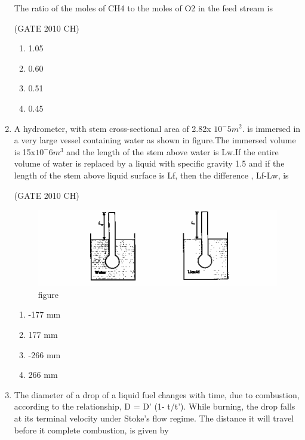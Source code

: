 \documentclass[journal,12pt,onecolumn]{exam}
\theoremstyle{remark}
\begin{document}
\begin{enumerate}
      
    The ratio of the moles of CH4 to the moles of O2 in the feed stream is 
  
  \hfill{(GATE 2010 CH)}\\

  \begin{enumerate}
      \item 1.05
      \item 0.60
      \item 0.51
      \item 0.45
  \end{enumerate}
\item 
   A hydrometer, with stem cross-sectional area of 2.82x $10^-5 m^2$. is immersed in a very large vessel containing water as shown in figure.The immersed volume is 15x$10^-6 m^3$ and the length of the stem above water is Lw.If the entire volume of water is replaced by a liquid with specific gravity 1.5 and if the length of the stem above liquid surface is Lf, then the difference , Lf-Lw, is
   
   \hfill{(GATE 2010 CH)}\\
   
\begin{figure}[H]
    \centering
    \includegraphics[width=1.0\linewidth]{figs/Q.34 image.png}
    \caption{figure}
    \label{fig:figs/Q.34 image.png}
\end{figure}
     
    \begin{enumerate}
        \item -177 mm
        \item 177 mm
        \item -266 mm
        \item 266 mm
        
    \end{enumerate}
\item 
  The diameter of a drop of a liquid fuel changes with time, due to combustion, according to the relationship, D = D' (1- t/t'). While burning, the drop falls at its terminal velocity under Stoke's flow regime. The distance it will travel before it complete combustion, is given by
 

\end{enumerate}
\end{document}
